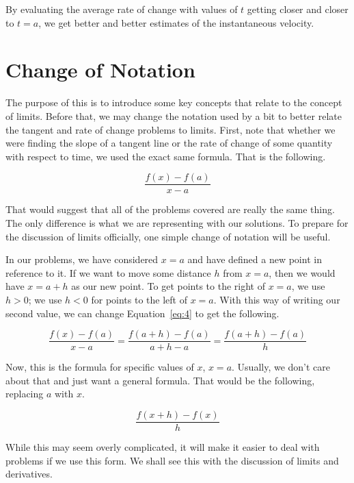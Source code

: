 \documentclass[12pt]{article}
\theoremstyle{definition}
\begin{document}
By evaluating the average rate of change with values of $t$ getting closer and closer to $t=a$, we get better and better estimates of the instantaneous velocity.

\section{Change of Notation}
The purpose of this is to introduce some key concepts that relate to the concept of limits.
Before that, we may change the notation used by a bit to better relate the tangent and rate of change problems to limits.
First, note that whether we were finding the slope of a tangent line or the rate of change of some quantity with respect to time, we used the exact same formula.
That is the following.

\begin{equation}
    \frac{f(x)-f(a)}{x-a} \label{eq:4}
\end{equation}

That would suggest that all of the problems covered are really the same thing.
The only difference is what we are representing with our solutions.
To prepare for the discussion of limits officially, one simple change of notation will be useful.

In our problems, we have considered $x=a$ and have defined a new point in reference to it.
If we want to move some distance $h$ from $x=a$, then we would have $x=a+h$ as our new point.
To get points to the right of $x=a$, we use $h>0$; we use $h<0$ for points to the left of $x=a$.
With this way of writing our second value, we can change Equation~\eqref{eq:4} to get the following.

\begin{equation}
    \frac{f(x)-f(a)}{x-a} = \frac{f(a+h)-f(a)}{a+h-a} = \frac{f(a+h)-f(a)}{h}
\end{equation}

Now, this is the formula for specific values of $x$, $x=a$.
Usually, we don't care about that and just want a general formula.
That would be the following, replacing $a$ with $x$.

\begin{equation}
    \frac{f(x+h)-f(x)}{h} \label{eq:5}
\end{equation}

While this may seem overly complicated, it will make it easier to deal with problems if we use this form.
We shall see this with the discussion of limits and derivatives.
\end{document}
